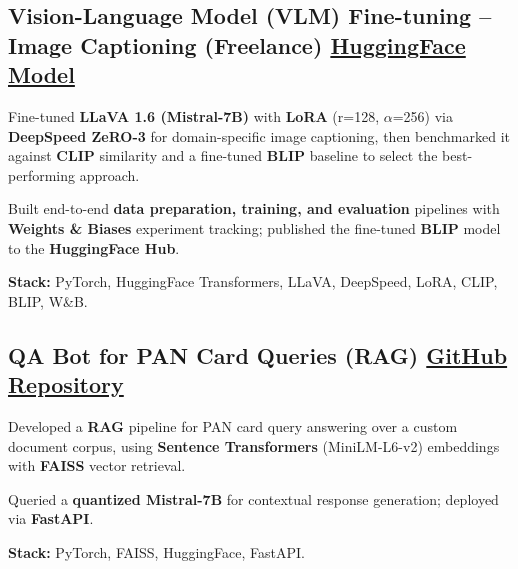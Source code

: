 \documentclass[letter,10pt]{article}
\begin{document}
\subsection{Vision-Language Model (VLM) Fine-tuning – Image Captioning (Freelance) \hfill \href{https://huggingface.co/sunil448832/blip-model}{HuggingFace Model}}
\begin{zitemize}
\item Fine-tuned \textbf{LLaVA 1.6 (Mistral-7B)} with \textbf{LoRA} (r=128, $\alpha$=256) via \textbf{DeepSpeed ZeRO-3} for domain-specific image captioning, then benchmarked it against \textbf{CLIP} similarity and a fine-tuned \textbf{BLIP} baseline to select the best-performing approach.
\item Built end-to-end \textbf{data preparation, training, and evaluation} pipelines with \textbf{Weights \& Biases} experiment tracking; published the fine-tuned \textbf{BLIP} model to the \textbf{HuggingFace Hub}.
\item \textbf{Stack:} PyTorch, HuggingFace Transformers, LLaVA, DeepSpeed, LoRA, CLIP, BLIP, W\&B.
\end{zitemize}

\subsection{QA Bot for PAN Card Queries (RAG) \hfill \href{https://github.com/sunil448832/Natural-Language-Processing/tree/master/RAG(Retrieval\%20Augment\%20Generation)}{GitHub Repository}}
\begin{zitemize}
\item Developed a \textbf{RAG} pipeline for PAN card query answering over a custom document corpus, using \textbf{Sentence Transformers} (MiniLM-L6-v2) embeddings with \textbf{FAISS} vector retrieval.
\item Queried a \textbf{quantized Mistral-7B} for contextual response generation; deployed via \textbf{FastAPI}.
\item \textbf{Stack:} PyTorch, FAISS, HuggingFace, FastAPI.
\end{zitemize}
\end{document}
